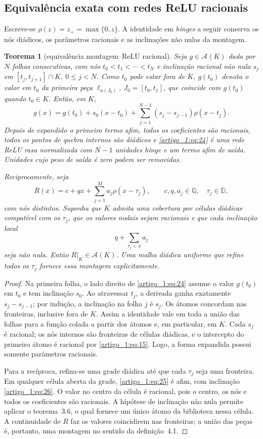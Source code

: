 \documentclass[12pt,a4paper]{article}
\theoremstyle{preciso}
\newtheorem{teorema}{Teorema}[section]
\theoremstyle{definition}
\newcommand{\Q}{\mathbb Q}
\newcommand{\D}{\mathbb D}
\newcommand{\Asm}{\mathcal A}
\newcommand{\eqn}[2]{\begin{equation}\label{eq:#1}#2\end{equation}}
\theoremstyle{preciso}
\theoremstyle{preciso}
\theoremstyle{preciso}
\theoremstyle{preciso}
\theoremstyle{definition}
\theoremstyle{preciso}
\theoremstyle{definition}
\theoremstyle{preciso}
\theoremstyle{preciso}
\theoremstyle{definition}
\begin{document}
\subsection{Equivalência exata com redes ReLU racionais}
Escreve-se $\rho(z)=z_+=\max\{0,z\}$. A identidade em \emph{hinges} a seguir conserva os nós diádicos, os parâmetros racionais e as inclinações não nulas da montagem.
\begin{teorema}[equivalência montagem--ReLU racional]\label{map:artigo_1:4.3}
Seja $g\in\Asm(K)$ dada por $N$ folhas consecutivas, com nós $t_0<t_1<\cdots<t_N$ e inclinação racional não nula $s_j$ em $[t_j,t_{j+1}]\cap K$, $0\le j<N$. Como $t_0$ pode estar fora de $K$, $g(t_0)$ denota o valor em $t_0$ da primeira peça $\ell_{n(J_0)}$, $J_0=[t_0,t_1]$, que coincide com $g(t_0)$ quando $t_0\in K$. Então, em $K$,
\eqn{24}{g(x)=g(t_0)+s_0(x-t_0)+\sum_{j=1}^{N-1}(s_j-s_{j-1})\rho(x-t_j).}
Depois de expandido o primeiro termo afim, todos os coeficientes são racionais, todos os pontos de quebra internos são diádicos e \eqref{artigo_1:eq:24} é uma rede ReLU rasa normalizada com $N-1$ unidades hinge e um termo afim de saída. Unidades cujo peso de saída é zero podem ser removidas.

Reciprocamente, seja
\eqn{25}{R(x)=c+qx+\sum_{j=1}^Ma_j\rho(x-\tau_j),\qquad c,q,a_j\in\Q,\quad\tau_j\in\D,}
com nós distintos. Suponha que $K$ admita uma cobertura por células diádicas compatível com os $\tau_j$, que os valores nodais sejam racionais e que cada inclinação local
\eqn{26}{q+\sum_{\tau_j<x}a_j}
seja não nula. Então $R|_K\in\Asm(K)$. Uma malha diádica uniforme que refine todos os $\tau_j$ fornece essa montagem explicitamente.
\end{teorema}
\begin{proof}
Na primeira folha, o lado direito de \eqref{artigo_1:eq:24} assume o valor $g(t_0)$ em $t_0$ e tem inclinação $s_0$. Ao atravessar $t_j$, a derivada ganha exatamente $s_j-s_{j-1}$; por indução, a inclinação na folha $j$ é $s_j$. Os átomos concordam nas fronteiras, inclusive fora de $K$. Assim a identidade vale
em toda a união das folhas para a função colada a partir dos átomos e, em particular, em $K$. Cada $s_j$ é racional; os nós internos são fronteiras de células diádicas, e o intercepto do primeiro átomo é racional por \eqref{artigo_1:eq:15}. Logo, a forma expandida possui somente parâmetros racionais.

Para a recíproca, refina-se uma grade diádica até que cada $\tau_j$ seja uma fronteira. Em qualquer célula aberta da grade, \eqref{artigo_1:eq:25} é afim, com inclinação \eqref{artigo_1:eq:26}. O valor no centro da célula é racional, pois o centro, os nós e todos os coeficientes são racionais. A hipótese de inclinação não nula permite aplicar o teorema~3.6, o qual fornece um único átomo da biblioteca nessa célula. A continuidade de $R$ faz os valores coincidirem nas fronteiras; a união das peças é, portanto, uma montagem no sentido da definição~4.1.
\end{proof}
\end{document}
